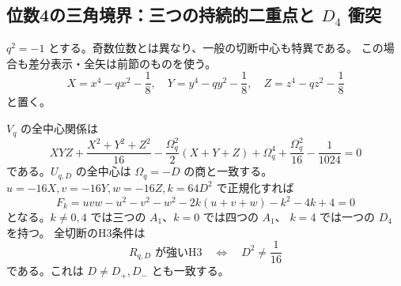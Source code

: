 \subsection{位数4の三角境界：三つの持続的二重点と $D_4$ 衝突}
\label{subsec:quantum-triangle-even4}
$q^2=-1$ とする。奇数位数とは異なり、一般の切断中心も特異である。
この場合も差分表示・全矢は前節のものを使う。
\[
 X=x^4-qx^2-\frac18,\quad Y=y^4-qy^2-\frac18,\quad
 Z=z^4-qz^2-\frac18
\]
と置く。

\begin{theorem}[位数4pencilの全判定]
\label{thm:quantum-triangle-order4}
$V_q$ の全中心関係は
\[
 XYZ+\frac{X^2+Y^2+Z^2}{16}
 -\frac{\Omega_q^2}{2}(X+Y+Z)
 +\Omega_q^4+\frac{\Omega_q^2}{16}-\frac1{1024}=0
\]
である。$U_{q,D}$ の全中心は $\Omega_q=-D$ の商と一致する。
$u=-16X,v=-16Y,w=-16Z,k=64D^2$ で正規化すれば
\[
 F_k=uvw-u^2-v^2-w^2-2k(u+v+w)-k^2-4k+4=0
\]
となる。$k\ne0,4$ では三つの $A_1$、$k=0$ では四つの $A_1$、
$k=4$ では一つの $D_4$ を持つ。
全切断のH3条件は
\[
 R_{q,D}\text{ が強いH3}\quad\Longleftrightarrow\quad
 D^2\ne\frac1{16}
\]
である。これは $D\ne D_+,D_-$ とも一致する。
\end{theorem}
